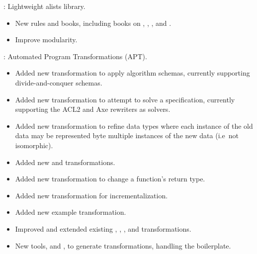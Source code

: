 
\begin{frame}

\implibtitle

:
Lightweight alists library.
\begin{itemize}
\item New rules and books, including books on ,
  , , and .
\item Improve modularity.
\end{itemize}

\end{frame}


\begin{frame}

\implibtitle

:
Automated Program Transformations (APT).
\begin{itemize}
\item Added new  transformation to apply algorithm schemas,
      currently supporting divide-and-conquer schemas.
\item Added new  transformation to attempt to solve a specification,
      currently supporting the ACL2 and Axe rewriters as solvers.
\item Added new  transformation to refine data types
      where each instance of the old data may be represented byte
      multiple instances of the new data (i.e\ not isomorphic).
\item Added new  and  transformations.
\item Added new  transformation to change a function's return type.
\item Added new  transformation for incrementalization.
\item Added new  example transformation.
\item Improved and extended existing
      , , , and 
      transformations.
\item New tools,  and , to generate transformations, handling
      the boilerplate.
\end{itemize}

\end{frame}

